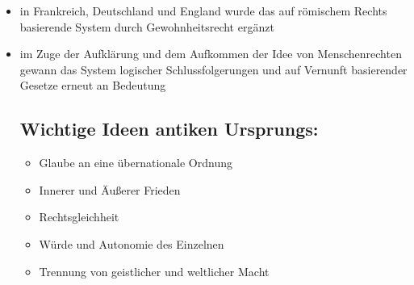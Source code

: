 \documentclass[11pt,a4paper]{article}
\begin{document}
\begin{itemize}
\item in Frankreich, Deutschland und England wurde das auf römischem Rechts basierende System durch Gewohnheitsrecht ergänzt

\item im Zuge der Aufklärung und dem Aufkommen der Idee von Menschenrechten gewann das System logischer Schlussfolgerungen und auf Vernunft basierender Gesetze erneut an Bedeutung

\subsection*{\textsf{Wichtige Ideen antiken Ursprungs:}}


\begin{itemize}
\item Glaube an eine übernationale Ordnung
\item Innerer und Äußerer Frieden
\item Rechtsgleichheit
\item Würde und Autonomie des Einzelnen
\item Trennung von geistlicher und weltlicher Macht
\end{itemize}


\end{itemize}
\end{document}
